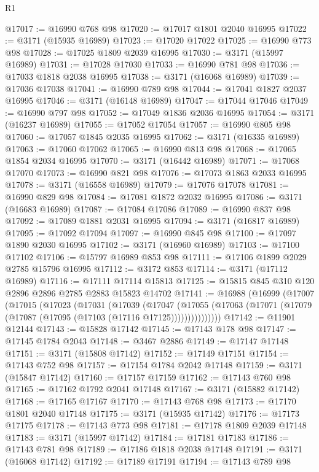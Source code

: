 \begin{lexlean}{R1}
\begin{coremodule}
@17017 := @16990 @768 @98
@17020 := @17017 @1801 @2040 @16995
@17022 := @3171 (@15935 @16989)
@17023 := @17020 @17022
@17025 := @16990 @773 @98
@17028 := @17025 @1809 @2039 @16995
@17030 := @3171 (@15997 @16989)
@17031 := @17028 @17030
@17033 := @16990 @781 @98
@17036 := @17033 @1818 @2038 @16995
@17038 := @3171 (@16068 @16989)
@17039 := @17036 @17038
@17041 := @16990 @789 @98
@17044 := @17041 @1827 @2037 @16995
@17046 := @3171 (@16148 @16989)
@17047 := @17044 @17046
@17049 := @16990 @797 @98
@17052 := @17049 @1836 @2036 @16995
@17054 := @3171 (@16237 @16989)
@17055 := @17052 @17054
@17057 := @16990 @805 @98
@17060 := @17057 @1845 @2035 @16995
@17062 := @3171 (@16335 @16989)
@17063 := @17060 @17062
@17065 := @16990 @813 @98
@17068 := @17065 @1854 @2034 @16995
@17070 := @3171 (@16442 @16989)
@17071 := @17068 @17070
@17073 := @16990 @821 @98
@17076 := @17073 @1863 @2033 @16995
@17078 := @3171 (@16558 @16989)
@17079 := @17076 @17078
@17081 := @16990 @829 @98
@17084 := @17081 @1872 @2032 @16995
@17086 := @3171 (@16683 @16989)
@17087 := @17084 @17086
@17089 := @16990 @837 @98
@17092 := @17089 @1881 @2031 @16995
@17094 := @3171 (@16817 @16989)
@17095 := @17092 @17094
@17097 := @16990 @845 @98
@17100 := @17097 @1890 @2030 @16995
@17102 := @3171 (@16960 @16989)
@17103 := @17100 @17102
@17106 := @15797 @16989 @853 @98
@17111 := @17106 @1899 @2029 @2785 @15796 @16995
@17112 := @3172 @853
@17114 := @3171 (@17112 @16989)
@17116 := @17111 @17114 @15813
@17125 := @15815 @845 @310 @120 @2896 @2896 @2785 @2883 @15823 @14702
@17141 := @16988
    (@16999
      (@17007
        (@17015
          (@17023
            (@17031
              (@17039
                (@17047
                  (@17055
                    (@17063 (@17071 (@17079 (@17087 (@17095 (@17103 (@17116 @17125)))))))))))))))
@17142 := @11901 @12144
@17143 := @15828 @17142
@17145 := @17143 @178 @98
@17147 := @17145 @1784 @2043
@17148 := @3467 @2886
@17149 := @17147 @17148
@17151 := @3171 (@15808 @17142)
@17152 := @17149 @17151
@17154 := @17143 @752 @98
@17157 := @17154 @1784 @2042 @17148
@17159 := @3171 (@15847 @17142)
@17160 := @17157 @17159
@17162 := @17143 @760 @98
@17165 := @17162 @1792 @2041 @17148
@17167 := @3171 (@15882 @17142)
@17168 := @17165 @17167
@17170 := @17143 @768 @98
@17173 := @17170 @1801 @2040 @17148
@17175 := @3171 (@15935 @17142)
@17176 := @17173 @17175
@17178 := @17143 @773 @98
@17181 := @17178 @1809 @2039 @17148
@17183 := @3171 (@15997 @17142)
@17184 := @17181 @17183
@17186 := @17143 @781 @98
@17189 := @17186 @1818 @2038 @17148
@17191 := @3171 (@16068 @17142)
@17192 := @17189 @17191
@17194 := @17143 @789 @98

\end{coremodule}
\end{lexlean}
